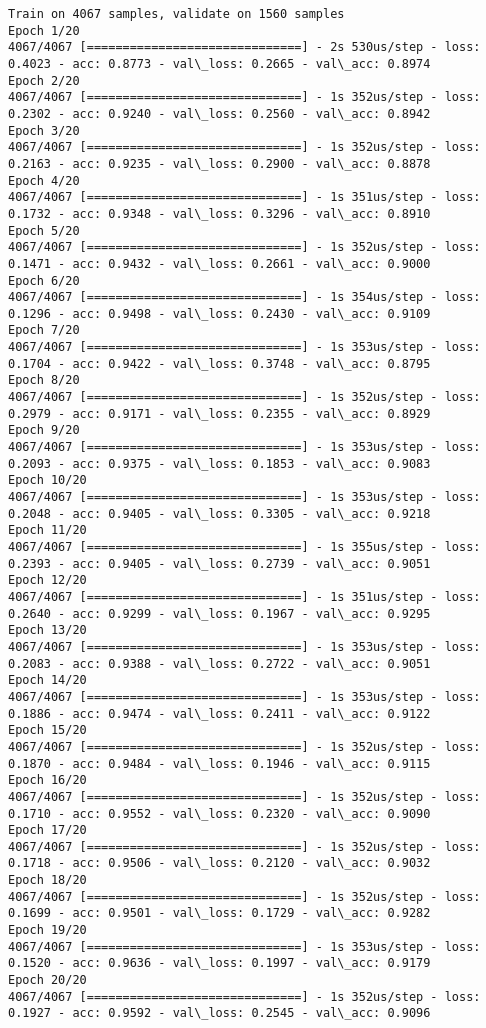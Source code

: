 \documentclass[11pt]{article}
\begin{document}
    \begin{Verbatim}[commandchars=\\\{\}]
Train on 4067 samples, validate on 1560 samples
Epoch 1/20
4067/4067 [==============================] - 2s 530us/step - loss: 0.4023 - acc: 0.8773 - val\_loss: 0.2665 - val\_acc: 0.8974
Epoch 2/20
4067/4067 [==============================] - 1s 352us/step - loss: 0.2302 - acc: 0.9240 - val\_loss: 0.2560 - val\_acc: 0.8942
Epoch 3/20
4067/4067 [==============================] - 1s 352us/step - loss: 0.2163 - acc: 0.9235 - val\_loss: 0.2900 - val\_acc: 0.8878
Epoch 4/20
4067/4067 [==============================] - 1s 351us/step - loss: 0.1732 - acc: 0.9348 - val\_loss: 0.3296 - val\_acc: 0.8910
Epoch 5/20
4067/4067 [==============================] - 1s 352us/step - loss: 0.1471 - acc: 0.9432 - val\_loss: 0.2661 - val\_acc: 0.9000
Epoch 6/20
4067/4067 [==============================] - 1s 354us/step - loss: 0.1296 - acc: 0.9498 - val\_loss: 0.2430 - val\_acc: 0.9109
Epoch 7/20
4067/4067 [==============================] - 1s 353us/step - loss: 0.1704 - acc: 0.9422 - val\_loss: 0.3748 - val\_acc: 0.8795
Epoch 8/20
4067/4067 [==============================] - 1s 352us/step - loss: 0.2979 - acc: 0.9171 - val\_loss: 0.2355 - val\_acc: 0.8929
Epoch 9/20
4067/4067 [==============================] - 1s 353us/step - loss: 0.2093 - acc: 0.9375 - val\_loss: 0.1853 - val\_acc: 0.9083
Epoch 10/20
4067/4067 [==============================] - 1s 353us/step - loss: 0.2048 - acc: 0.9405 - val\_loss: 0.3305 - val\_acc: 0.9218
Epoch 11/20
4067/4067 [==============================] - 1s 355us/step - loss: 0.2393 - acc: 0.9405 - val\_loss: 0.2739 - val\_acc: 0.9051
Epoch 12/20
4067/4067 [==============================] - 1s 351us/step - loss: 0.2640 - acc: 0.9299 - val\_loss: 0.1967 - val\_acc: 0.9295
Epoch 13/20
4067/4067 [==============================] - 1s 353us/step - loss: 0.2083 - acc: 0.9388 - val\_loss: 0.2722 - val\_acc: 0.9051
Epoch 14/20
4067/4067 [==============================] - 1s 353us/step - loss: 0.1886 - acc: 0.9474 - val\_loss: 0.2411 - val\_acc: 0.9122
Epoch 15/20
4067/4067 [==============================] - 1s 352us/step - loss: 0.1870 - acc: 0.9484 - val\_loss: 0.1946 - val\_acc: 0.9115
Epoch 16/20
4067/4067 [==============================] - 1s 352us/step - loss: 0.1710 - acc: 0.9552 - val\_loss: 0.2320 - val\_acc: 0.9090
Epoch 17/20
4067/4067 [==============================] - 1s 352us/step - loss: 0.1718 - acc: 0.9506 - val\_loss: 0.2120 - val\_acc: 0.9032
Epoch 18/20
4067/4067 [==============================] - 1s 352us/step - loss: 0.1699 - acc: 0.9501 - val\_loss: 0.1729 - val\_acc: 0.9282
Epoch 19/20
4067/4067 [==============================] - 1s 353us/step - loss: 0.1520 - acc: 0.9636 - val\_loss: 0.1997 - val\_acc: 0.9179
Epoch 20/20
4067/4067 [==============================] - 1s 352us/step - loss: 0.1927 - acc: 0.9592 - val\_loss: 0.2545 - val\_acc: 0.9096

    \end{Verbatim}
\end{document}
